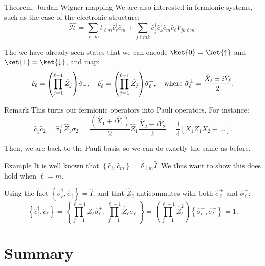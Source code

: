 \documentclass[a4paper]{article}
\begin{document}
\begin{parag}{Theorem: Jordan-Wigner mapping}
    We are also interested in fermionic systems, such as the case of the electronic structure:
    \[\hat{\mathcal{H}} = \sum_{\ell, m} t_{\ell m} \hat{c}_{\ell}^{\dagger} \hat{c}_m + \sum_{j \ell m k} \hat{c}_j^{\dagger} \hat{c}_k^{\dagger} \hat{c}_m \hat{c}_{\ell} V_{jk\ell m}.\]

    The  we have already seen states that we can encode $\ket{0} = \ket{\uparrow}$ and $\ket{1} = \ket{\downarrow}$, and map:
    \[\hat{c}_{\ell} = \left(\prod_{j=1}^{\ell-1} \hat{Z}_{j}\right) \hat{\sigma}_{-}, \mathspace \hat{c}_{\ell}^{\dagger} = \left(\prod_{j=1}^{\ell - 1} \hat{Z}_{j}\right) \hat{\sigma}_{\ell}^{+}, \mathspace \text{where }\hat{\sigma}_{\ell}^{\pm} = \frac{\hat{X}_{\ell} \pm i \hat{Y}_{\ell}}{2}.\]

    \begin{subparag}{Remark}
        This turns our fermionic operators into Pauli operators. For instance:
        \[\hat{c}_1^{\dagger} \hat{c}_2 = \hat{\sigma}_1^+ \hat{Z}_1 \hat{\sigma}_2^- = \frac{\left(\hat{X}_1 + i \hat{Y}_1\right)}{2} \hat{Z}_1 \frac{\hat{X}_2 - i \hat{Y}_2}{2} = \frac{1}{4}\left[X_1 Z_1 X_2 + \ldots\right].\]

        Then, we are back to the Pauli basis, so we can do exactly the same as before.
    \end{subparag}

    \begin{subparag}{Example}
        It is well known that $\left\{\hat{c}_{\ell}, \hat{c}_{m}\right\} = \delta_{\ell m} \hat{I}$. We thus want to show this does hold when $\ell = m$.

        Using the fact $\left\{\hat{\sigma}_{\ell}^{\dagger}, \hat{\sigma}_{\ell}\right\} = \hat{I}$, and that $\hat{Z}_{\ell}$ anticommutes with both $\hat{\sigma}_{\ell}^+$ and $\hat{\sigma}_{\ell}^-$:
        \[ \left\{\hat{c}_{\ell}^{\dagger}, \hat{c}_{\ell}\right\} = \left\{\prod_{j=1}^{\ell - 1} Z_{\ell} \hat{\sigma}_{\ell}^+, \prod_{j=1}^{\ell - 1} \hat{Z}_{\ell} \sigma^-_{\ell}\right\} = \left(\prod_{j=1}^{\ell - 1} \hat{Z}_{\ell}^2\right) \left\{\hat{\sigma}_{\ell}^+, \hat{\sigma}_{\ell}^-\right\} = 1.\]
    \end{subparag}
\end{parag}

\section{Summary}
    
\end{document}
